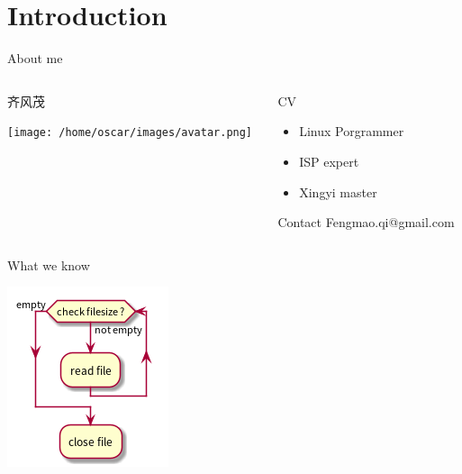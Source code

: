 \documentclass[presentation]{beamer}
\begin{document}
\section{Introduction}
\label{sec:orgd61ab18}
\begin{frame}[label={sec:orge1e6175}]{About me}
\begin{columns}
\begin{column}{0.45\columnwidth}
\begin{block}{齐风茂}
\begin{center}
\texttt{[image: /home/oscar/images/avatar.png]}
\end{center}
\end{block}
\end{column}
\begin{column}{0.45\columnwidth}
\begin{block}{CV}
\begin{itemize}
\item Linux Porgrammer
\item ISP expert
\item Xingyi master
\end{itemize}
\begin{block}{Contact}
Fengmao.qi@gmail.com
\end{block}
\end{block}
\end{column}
\end{columns}
\end{frame}
\begin{frame}[label={sec:org645e995}]{What we know}
\begin{center}
\includegraphics[width=.9\linewidth]{imgs/test.png}
\end{center}
\end{frame}
\end{document}
